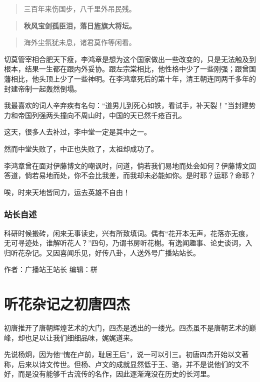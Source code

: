 \documentclass[]{book}
\begin{document}
\begin{quote}
三百年来伤国步，八千里外吊民残。
\end{quote}

\begin{quote}
\textbf{秋风宝剑孤臣泪，落日旌旗大将坛。}
\end{quote}

\begin{quote}
海外尘氛犹未息，诸君莫作等闲看。
\end{quote}

切莫管宰相合肥天下瘦，李鸿章是想为这个国家做出一些改变的，只是无法触及到根本，结果一生都在跟内外妥协。跟左宗棠相比，他性格中少了一些刚强；跟曾国藩相比，他头顶上少了一些神明。在李鸿章死后的第十年，清王朝连同两千多年的封建帝制一起轰然倒塌。

我最喜欢的词人辛弃疾有名句：``道男儿到死心如铁，看试手，补天裂！''当封建势力和帝国列强两头撞向不周山时，中国的天已然千疮百孔。

这天，很多人去补过，李中堂一定是其中之一。

然而中堂失败了，中正也失败了，太祖却成功了。

李鸿章曾在面对伊藤博文的嘲讽时，问道，倘若我们易地而处会如何？伊藤博文回答道，倘若易地而处，你不会比我差，而我却未必能如你。是时耶？运耶？命耶？

唉，时来天地皆同力，运去英雄不自由！

\subsubsection*{站长自述}

科研时候搬砖，闲来无事读史，兴有所致填词。偶有``花开本无声，花落亦无痕，无可寻迹处，谁解听花人？''四句，乃谓书房听花榭。有逸闻趣事、论史谈词，入归听花杂记。又因喜闻乐见，好传八卦，人送外号广播站站长。

作者：广播站王站长 编辑：栟

\section{听花杂记之初唐四杰}

初唐推开了唐朝辉煌艺术的大门，四杰是透出的一缕光。四杰虽不是唐朝艺术的巅峰，却也足以让我们细细品味，娓娓道来。

先说杨炯，因为他``愧在卢前，耻居王后''，说一可以引三。初唐四杰开始以文著称，后来以诗文传世。但杨、卢文的成就显然低于王、骆，并不是说他们的文不好，而是没有能够千古流传的名作，因此逐渐淹没在历史的长河里。
\end{document}

